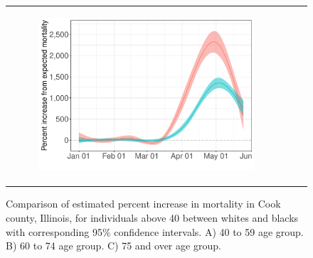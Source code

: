 \documentclass[11pt]{article}
\begin{document}
\begin{figure}[ht]
\begin{tabular}{lll}
\begin{subfigure}[t]{0.3\linewidth}
		\includegraphics[width=1\linewidth]{figs/figure-3c.pdf}
	\end{subfigure}\\
	\end{tabular}
	\caption{Comparison of estimated percent increase in mortality in Cook county, Illinois, for individuals above 40 between whites and blacks with corresponding 95\% confidence intervals. A) 40 to 59 age group. B) 60 to 74 age group. C) 75 and over age group.}
	\label{fig:cook-white-v-black}
\end{figure}
\end{document}
